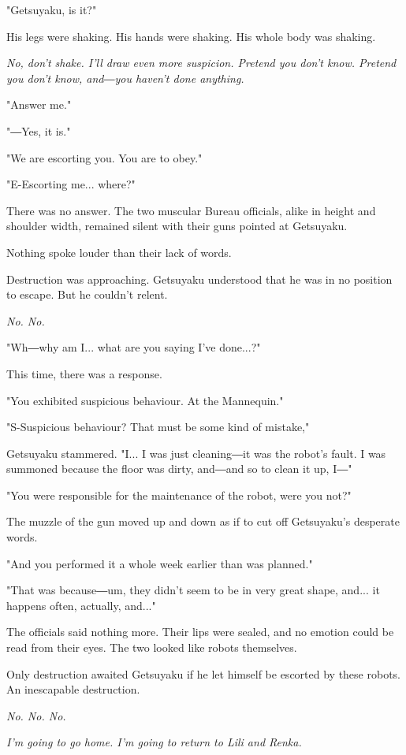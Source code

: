 "Getsuyaku, is it?"

His legs were shaking. His hands were shaking. His whole body was
shaking.

\emph{No, don't shake. I'll draw even more suspicion. Pretend you don't know.
Pretend you don't know, and―you haven't done anything.}

"Answer me."

"―Yes, it is."

"We are escorting you. You are to obey."

\mybreak

"E-Escorting me... where?"

There was no answer. The two muscular Bureau officials, alike in height
and shoulder width, remained silent with their guns pointed at
Getsuyaku.

Nothing spoke louder than their lack of words.

Destruction was approaching. Getsuyaku understood that he was in no
position to escape. But he couldn't relent.

\emph{No. No.}

"Wh―why am I... what are you saying I've done...?"~

This time, there was a response.

"You exhibited suspicious behaviour. At the Mannequin."

"S-Suspicious behaviour? That must be some kind of mistake,"~

Getsuyaku stammered. "I... I was just cleaning―it was the robot's fault.
I was summoned because the floor was dirty, and―and so to clean it up,
I―"

"You were responsible for the maintenance of the robot, were you not?"

The muzzle of the gun moved up and down as if to cut off Getsuyaku's
desperate words.

"And you performed it a whole week earlier than was planned."

"That was because―um, they didn't seem to be in very great shape, and...
it happens often, actually, and..."

The officials said nothing more. Their lips were sealed, and no emotion
could be read from their eyes. The two looked like robots themselves.

Only destruction awaited Getsuyaku if he let himself be escorted by
these robots. An inescapable destruction.

\emph{No. No. No.}

\emph{I'm going to go home. I'm going to return to Lili and Renka.}

